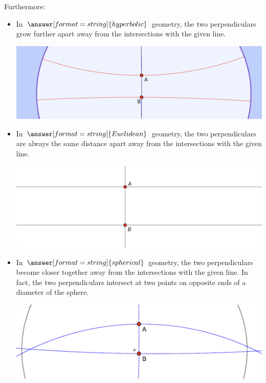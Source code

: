\documentclass{ximera}
\begin{document}
\begin{problem}
\begin{problem}
\begin{problem}
\begin{problem}
Furthermore:  
\begin{itemize}
\item In $\answer[format=string]{hyperbolic}$ geometry, the two perpendiculars grow further apart away from the intersections with the given line.  
\begin{center}
\includegraphics{hyperbolicPerpendiculars.png}
\end{center}
\item In $\answer[format=string]{Euclidean}$ geometry, the two perpendiculars are always the same distance apart away from the intersections with the given line.  
\begin{center}
\includegraphics{euclideanPerpendiculars.png}
\end{center}
\item In $\answer[format=string]{spherical}$ geometry, the two perpendiculars become closer together away from the intersections with the given line. In fact, the two perpendiculars intersect at two points on opposite ends of a diameter of the sphere. 
\begin{center}
\includegraphics{sphericalPerpendiculars.png}
\end{center}
\end{itemize}
\end{problem}
\end{problem}
\end{problem} 
\end{problem}
\end{document}
